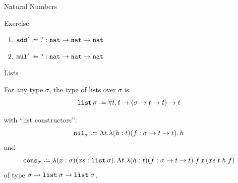 \begin{frame}[allowframebreaks]{Natural Numbers}
\begin{block}{Exercise}
  \begin{enumerate}
    \item $\add'\defeq \;? : \nat\to\nat\to\nat$
    \item $\mul'\defeq \;? : \nat\to\nat\to\nat$
  \end{enumerate}
\end{block}
\end{frame}

\begin{frame}{Lists}
\begin{definition}
  For any type $\sigma$, the type of lists over $\sigma$ is 
\[
  \List\,\sigma\defeq \forall t.\, t \to (\sigma \to t \to t) \to t 
\]
\end{definition}
with ``list constructors'':
\[
  \mathtt{nil}_\sigma \defeq \Lambda t.\lambda (h : t)(f : \sigma\to t \to t).\,
  h
\]
and  
\[
  \mathtt{cons}_\sigma \defeq \lambda (x : \sigma)(xs : \List\,
  \sigma).\,\Lambda t.\lambda(h : t)(f : \sigma\to t \to t).f\,x\,(xs\; t\;
  h\; f)
\]
of type $\sigma \to \mathtt{list}\;\sigma \to \mathtt{list}\;\sigma$.


\end{frame}

